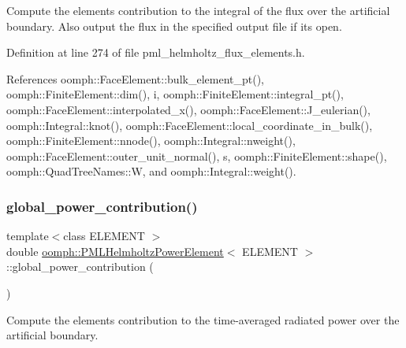 Compute the element\textquotesingle{}s contribution to the integral of the flux over the artificial boundary. Also output the flux in the specified output file if it\textquotesingle{}s open. 



Definition at line 274 of file pml\+\_\+helmholtz\+\_\+flux\+\_\+elements.\+h.



References oomph\+::\+Face\+Element\+::bulk\+\_\+element\+\_\+pt(), oomph\+::\+Finite\+Element\+::dim(), i, oomph\+::\+Finite\+Element\+::integral\+\_\+pt(), oomph\+::\+Face\+Element\+::interpolated\+\_\+x(), oomph\+::\+Face\+Element\+::\+J\+\_\+eulerian(), oomph\+::\+Integral\+::knot(), oomph\+::\+Face\+Element\+::local\+\_\+coordinate\+\_\+in\+\_\+bulk(), oomph\+::\+Finite\+Element\+::nnode(), oomph\+::\+Integral\+::nweight(), oomph\+::\+Face\+Element\+::outer\+\_\+unit\+\_\+normal(), s, oomph\+::\+Finite\+Element\+::shape(), oomph\+::\+Quad\+Tree\+Names\+::W, and oomph\+::\+Integral\+::weight().

\mbox{\label{classoomph_1_1PMLHelmholtzPowerElement_a7641df9f59097452dfac823d2384c290}} 
\subsubsection{\texorpdfstring{global\+\_\+power\+\_\+contribution()}{global\_power\_contribution()}\hspace{0.1cm}{\footnotesize\ttfamily [1/2]}}
{\footnotesize\ttfamily template$<$class E\+L\+E\+M\+E\+NT $>$ \\
double \hyperlink{classoomph_1_1PMLHelmholtzPowerElement}{oomph\+::\+P\+M\+L\+Helmholtz\+Power\+Element}$<$ E\+L\+E\+M\+E\+NT $>$\+::global\+\_\+power\+\_\+contribution (\begin{DoxyParamCaption}{ }\end{DoxyParamCaption})\hspace{0.3cm}{\ttfamily [inline]}}



Compute the element\textquotesingle{}s contribution to the time-\/averaged radiated power over the artificial boundary. 



